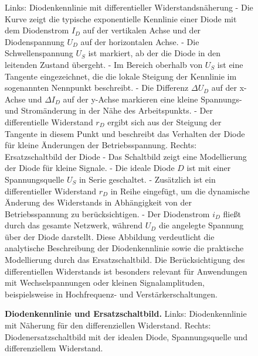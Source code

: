 {\begin{figure}[H]
\begin{minipage}[c]{0.45\textwidth}
{        Links: Diodenkennlinie mit differentieller Widerstandsnäherung
        - Die Kurve zeigt die typische exponentielle Kennlinie einer Diode mit dem Diodenstrom \( I_D \) auf der vertikalen Achse und der Diodenspannung \( U_D \) auf der horizontalen Achse.  
        - Die Schwellenspannung \( U_S \) ist markiert, ab der die Diode in den leitenden Zustand übergeht.  
        - Im Bereich oberhalb von \( U_S \) ist eine Tangente eingezeichnet, die die lokale Steigung der Kennlinie im sogenannten Nennpunkt beschreibt.  
        - Die Differenz \( \Delta U_D \) auf der x-Achse und \( \Delta I_D \) auf der y-Achse markieren eine kleine Spannungs- und Stromänderung in der Nähe des Arbeitspunkts.  
        - Der differentielle Widerstand \( r_D \) ergibt sich aus der Steigung der Tangente in diesem Punkt und beschreibt das Verhalten der Diode für kleine Änderungen der Betriebsspannung.  
        Rechts: Ersatzschaltbild der Diode
        - Das Schaltbild zeigt eine Modellierung der Diode für kleine Signale.  
        - Die ideale Diode \( D \) ist mit einer Spannungsquelle \( U_S \) in Serie geschaltet.  
        - Zusätzlich ist ein differentieller Widerstand \( r_D \) in Reihe eingefügt, um die dynamische Änderung des Widerstands in Abhängigkeit von der Betriebsspannung zu berücksichtigen.  
        - Der Diodenstrom \( i_D \) fließt durch das gesamte Netzwerk, während \( U_D \) die angelegte Spannung über der Diode darstellt.  
        Diese Abbildung verdeutlicht die analytische Beschreibung der Diodenkennlinie sowie die praktische Modellierung durch das Ersatzschaltbild. Die Berücksichtigung des differentiellen Widerstands ist besonders relevant für Anwendungen mit Wechselspannungen oder kleinen Signalamplituden, beispielsweise in Hochfrequenz- und Verstärkerschaltungen.}
    \end{minipage}
    \caption{\textbf{Diodenkennlinie und Ersatzschaltbild.} Links: Diodenkennlinie mit Näherung für den differenziellen
        Widerstand. Rechts: Diodenersatzschaltbild mit der idealen Diode, Spannungsquelle und differenziellem Widerstand.}
    \label{fig:DiodenkennlinieUndErsatzschaltbild}
\end{figure}
} 


